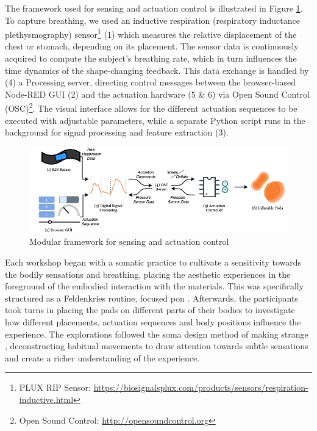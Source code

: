 The framework used for sensing and actuation control is illustrated in Figure \ref{fig:workflow}.
To capture breathing, we used an inductive respiration (respiratory inductance plethysmography) sensor\footnote{PLUX RIP Sensor: \url{https://biosignalsplux.com/products/sensors/respiration-inductive.html}} (1) which measures the relative displacement of the chest or stomach, depending on its placement. The sensor data is continuously acquired to compute the subject's breathing rate, which in turn influences the time dynamics of the shape-changing feedback. This data exchange is handled by (4) a Processing server, directing control messages between the browser-based Node-RED GUI (2) and the actuation hardware (5 \& 6) via Open Sound Control (OSC)\footnote{Open Sound Control:  \url{http://opensoundcontrol.org}}. The visual interface allows for the different actuation sequences to be executed with adjustable parameters, while a separate Python script runs in the background for signal processing and feature extraction (3). 

\begin{figure}[t]
    \centering  
    \includegraphics[width=1.0\linewidth]{Chapters/Figures/soma_chi/fig_2_framework.png}
    \caption{Modular framework for sensing and actuation control}
    \label{fig:workflow}
\end{figure}


Each workshop began with a somatic practice to cultivate a sensitivity towards the bodily sensations and breathing, placing the aesthetic experiences in the foreground of the embodied interaction with the materials. This was specifically structured as a Feldenkries routine, focused pon . Afterwards, the participants took turns in placing the pads on different parts of their bodies to investigate how different placements, actuation sequences and body positions influence the experience. The explorations followed the soma design method of making strange \cite{loke_moving_2013}, deconstructing habitual movements to draw attention towards subtle sensations and create a richer understanding of the experience.


